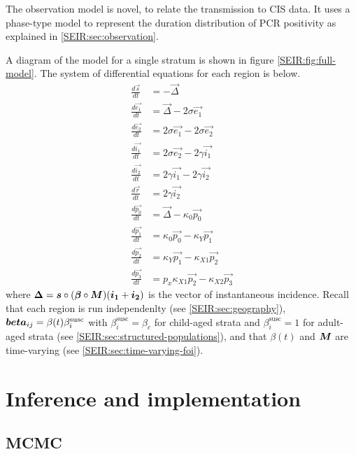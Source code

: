 \documentclass[thesis.tex]{subfiles}
\begin{document}
The observation model is novel, to relate the transmission to CIS data.
It uses a phase-type model to represent the duration distribution of PCR positivity as explained in \cref{SEIR:sec:observation}.

A diagram of the model for a single stratum is shown in figure \cref{SEIR:fig:full-model}.
The system of differential equations for each region is below.
\begin{align}
    \label{SEIR:eq:fullODEs}
    \frac{d\vec{s}}{dt} &= -\vec{\Delta} \\
    \frac{d\vec{e_1}}{dt} &= \vec{\Delta} - 2\sigma \vec{e_1} \\
    \frac{d\vec{e_2}}{dt} &= 2\sigma \vec{e_1} - 2\sigma \vec{e_2} \\
    \frac{d\vec{i_1}}{dt} &= 2\sigma \vec{e_2} - 2\gamma \vec{i_1} \\
    \frac{d\vec{i_2}}{dt} &= 2\gamma \vec{i_1} - 2\gamma \vec{i_2} \\
    \frac{d\vec{r}}{dt} &= 2\gamma \vec{i_2} \\
    \frac{d\vec{p_0}}{dt} &= \vec{\Delta} - \kappa_0 \vec{p_0} \\
    \frac{d\vec{p_1}}{dt} &= \kappa_0 \vec{p_0} - \kappa_Y \vec{p_1} \\
    \frac{d\vec{p_2}}{dt} &= \kappa_Y \vec{p_1} - \kappa_{X1} \vec{p_2} \\
    \frac{d\vec{p_3}}{dt} &= p_x \kappa_{X1} \vec{p_2} - \kappa_{X2} \vec{p_3}
\end{align}
where $\bm{\Delta} = \bm{s} \circ (\bm{\beta} \circ \bm{M}) (\bm{i_1} + \bm{i_2})$ is the vector of instantaneous incidence.
Recall that each region is run independenlty (see \cref{SEIR:sec:geography}), $\bm{beta}_{ij} = \beta(t) \beta^\text{susc}_i$ with $\beta^\text{susc}_i = \beta_c$ for child-aged strata and $\beta^\text{susc}_i = 1$ for adult-aged strata (see \cref{SEIR:sec:structured-populations}), and that $\beta(t)$ and $\bm{M}$ are time-varying (see \cref{SEIR:sec:time-varying-foi}).

\section{Inference and implementation} \label{SEIR:sec:inference-implementation}

\subsection{MCMC}
\end{document}
